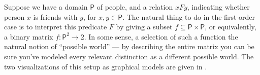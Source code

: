 \documentclass{article}
\newcommand\cmergearr[4]{
		\draw[arr,-] (#1) -- (#4) -- (#2);
		\draw[arr, shorten <=0] (#4) -- (#3);
	}
\newcommand\mergearr[3]{
		\coordinate (center-#1#2#3) at (barycentric cs:#1=1,#2=1,#3=1.2);
		\cmergearr{#1}{#2}{#3}{center-#1#2#3}
	}
\theoremstyle{definition}
\theoremstyle{remark}
\newcommand{\var}[1]{\mathsf{#1}}
\begin{document}
\begin{example}
    Suppose we have a domain $\var P$ of people, and a relation $xFy$, indicating whether person $x$ is friends with $y$, for $x,y\in \var P$. 
    The natural thing to do in the first-order case is to interpret this predicate $F$ by giving a subset $f \subseteq \var P \times \var P$, or equivalently, a binary matrix $f : \var P^2 \to 2$. 
    In some sense, a selection of such a function the natural notion of ``possible world'' --- by describing the entire matrix you can be sure you've modeled every relevant distinction as a different possible world. The two visualizations of this setup as graphical models are given in .
    
    \begin{figure}
        \centering
        \hfill
        \begin{subfigure}[]{0.4\textwidth} \centering
        \end{subfigure}
        \hfill\vline\hfill
        \begin{subfigure}[]{0.4\textwidth}\centering
        \end{subfigure}
        \hfill
        \caption{}
        \label{fig:friendrel}
    \end{figure}



\end{example}
\end{document}
